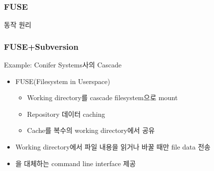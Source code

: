 \begin{frame}
\frametitle{FUSE}

동작 원리

\begin{center}
\end{center}


\end{frame}

\begin{frame}
\frametitle{FUSE+Subversion}

Example: Conifer Systems사의 Cascade

\begin{center}
\end{center}

\begin{itemize}
\item FUSE(Filesystem in Userspace) 
  \begin{itemize}
  \item Working directory를 cascade filesystem으로 mount
  \item Repository 데이터 caching
  \item Cache를 복수의 working directory에서 공유
  \end{itemize}
\item Working directory에서 파일 내용을 읽거나 바꿀 때만 file data 전송 
\item {}을 대체하는  command line interface 제공
\end{itemize}


\end{frame}

